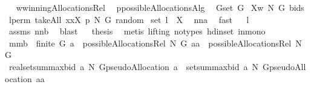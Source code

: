 \begin{isabellebody}
\isamarkupfalse%
\ {\isacharminus}\isanewline
{}\isamarkupfalse%
\ {\isacharquery}w{\isacharequal}winningAllocationsRel\ \isamarkupfalse%
\ {\isacharquery}p{\isacharequal}possibleAllocationsAlg{}\ \isamarkupfalse%
\ {\isacharquery}G{\isacharequal}{\isachardoublequoteopen}set\ G{\isachardoublequoteclose}\isanewline
{}\isamarkupfalse%
\ {\isacharquery}X{\isacharequal}{\isachardoublequoteopen}{\isacharquery}w\ N\ {\isacharquery}G\ bids{\isachardoublequoteclose}\ \isamarkupfalse%
\ {\isacharquery}l{\isacharequal}{\isachardoublequoteopen}perm{}\ {\isacharparenleft}takeAll\ {\isacharparenleft}{\isacharpercent}x{\isachardot}{\isacharparenleft}x{\isasymin}{\isacharquery}X{\isacharparenright}{\isacharparenright}\ {\isacharparenleft}{\isacharquery}p\ N\ G{\isacharparenright}{\isacharparenright}\ random{\isachardoublequoteclose}\isanewline
{}\isamarkupfalse%
\ {\isachardoublequoteopen}set\ {\isacharquery}l\ {\isasymsubseteq}\ {\isacharquery}X{\isachardoublequoteclose}\ \isamarkupfalse%
\ nn{}{}a\ \isamarkupfalse%
\ fast\isanewline
{}\isamarkupfalse%
\ \isamarkupfalse%
\ {\isachardoublequoteopen}{\isacharquery}l\ {\isasymnoteq}\ {\isacharbrackleft}{\isacharbrackright}{\isachardoublequoteclose}\ \isamarkupfalse%
\ assms\ nn{}{}b\ \isamarkupfalse%
\ blast\isanewline
{}\isamarkupfalse%
\ \isamarkupfalse%
\ {\isacharquery}thesis\ \isamarkupfalse%
\ {\isacharparenleft}metis\ {\isacharparenleft}lifting{\isacharcomma}\ no{\isacharunderscore}types{\isacharparenright}\ hd{\isacharunderscore}in{\isacharunderscore}set\ in{\isacharunderscore}mono{\isacharparenright}\isanewline
{}\isamarkupfalse%
%
\endisatagproof
{\isafoldproof}%
%
\isadelimproof
\isanewline
%
\endisadelimproof
\isanewline
{}\isamarkupfalse%
\ mm{}{}b{\isacharcolon}\ \ {\isachardoublequoteopen}finite\ G{\isachardoublequoteclose}\ {\isachardoublequoteopen}a\ {\isasymin}\ possibleAllocationsRel\ N\ G{\isachardoublequoteclose}\ {\isachardoublequoteopen}aa\ {\isasymin}\ possibleAllocationsRel\ N\ G{\isachardoublequoteclose}\isanewline
{}\ {\isachardoublequoteopen}real{\isacharparenleft}setsum{\isacharparenleft}maxbid{\isacharprime}\ a\ N\ G{\isacharparenright}{\isacharparenleft}pseudoAllocation\ a{\isacharparenright}{\isacharparenright}\ {\isacharminus}\ setsum{\isacharparenleft}maxbid{\isacharprime}\ a\ N\ G{\isacharparenright}{\isacharparenleft}pseudoAllocation\ aa{\isacharparenright}\ \isanewline

\end{isabellebody}
